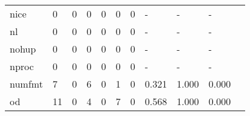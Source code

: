 \begin{longtable}{lp{1.2cm}p{1.2cm}p{1.2cm}p{1.2cm}p{1.2cm}p{1.2cm}p{1.2cm}p{1.2cm}p{1.2cm}p{1.2cm}}
nice      &                                     0 &                                                  0 &                                                0 &                                               0 &                                                0 &                                              0 &                                             - &                                                  - &                                                  - \\
nl        &                                     0 &                                                  0 &                                                0 &                                               0 &                                                0 &                                              0 &                                             - &                                                  - &                                                  - \\
nohup     &                                     0 &                                                  0 &                                                0 &                                               0 &                                                0 &                                              0 &                                             - &                                                  - &                                                  - \\
nproc     &                                     0 &                                                  0 &                                                0 &                                               0 &                                                0 &                                              0 &                                             - &                                                  - &                                                  - \\
numfmt    &                                     7 &                                                  0 &                                                6 &                                               0 &                                                1 &                                              0 &                                         0.321 &                                              1.000 &                                              0.000 \\
od        &                                    11 &                                                  0 &                                                4 &                                               0 &                                                7 &                                              0 &                                         0.568 &                                              1.000 &                                              0.000 \\

\end{longtable}

